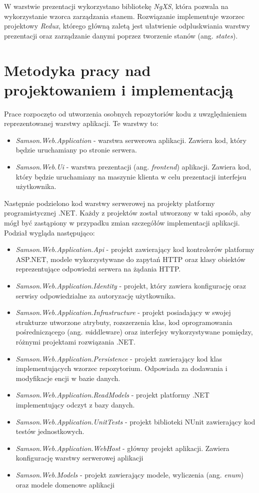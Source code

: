 \documentclass[a4paper,twoside,12pt]{book}
\newcommand{\obcy}[1]{\emph{#1}}
\newcommand{\ang}[1]{{\selectlanguage{british}\obcy{#1}}}
\begin{document}
	W warstwie prezentacji wykorzystano bibliotekę \textit{NgXS}, która pozwala na wykorzystanie wzorca zarządzania stanem. Rozwiązanie implementuje wzorzec projektowy \textit{Redux}, którego główną zaletą jest ułatwienie odpluskwiania warstwy prezentacji oraz zarządzanie danymi poprzez tworzenie stanów (ang. \ang{states}).
	
	\section {Metodyka pracy nad projektowaniem i implementacją}
	
	Prace rozpoczęto od utworzenia osobnych repozytoriów kodu z uwzględnieniem reprezentowanej warstwy aplikacji. Te warstwy to:
	\begin{itemize}
		\item \textit{Samson.Web.Application} - warstwa serwerowa aplikacji. Zawiera kod, który będzie uruchamiany po stronie serwera.
		\item \textit{Samson.Web.Ui} - warstwa prezentacji (ang. \ang{frontend}) aplikacji. Zawiera kod, który będzie uruchamiany na maszynie klienta w celu prezentacji interfejsu użytkownika.
	\end{itemize}

	Następnie podzielono kod warstwy serwerowej na projekty platformy programistycznej .NET. Każdy z projektów został utworzony w taki sposób, aby mógł być zastąpiony w przypadku zmian szczegółów implementacji aplikacji. Podział wygląda następująco:
	\begin{itemize}
		\item \textit{Samson.Web.Application.Api} - projekt zawierający kod kontrolerów platformy ASP.NET, modele wykorzystywane do zapytań HTTP oraz klasy obiektów reprezentujące odpowiedzi serwera na żądania HTTP.
		\item \textit{Samson.Web.Application.Identity} - projekt, który zawiera konfigurację oraz serwisy odpowiedzialne za autoryzację użytkownika.
		\item \textit{Samson.Web.Application.Infrastructure} - projekt posiadający w swojej strukturze utworzone atrybuty, rozszerzenia klas, kod oprogramowania pośredniczącego (ang. \ang middleware) oraz interfejsy wykorzystywane pomiędzy, różnymi projektami rozwiązania .NET.
		\item \textit{Samson.Web.Application.Persistence} - projekt zawierający kod klas implementujących wzorzec repozytorium. Odpowiada za dodawania i modyfikacje encji w bazie danych.
		\item \textit{Samson.Web.Application.ReadModels} - projekt platformy .NET implementujący odczyt z bazy danych.
		\item \textit{Samson.Web.Application.UnitTests} - projekt biblioteki NUnit zawierający kod testów jednostkowych.
		\item \textit{Samson.Web.Application.WebHost} - główny projekt aplikacji. Zawiera konfigurację warstwy serwerowej aplikacji
		\item \textit{Samson.Web.Models} - projekt zawierający modele, wyliczenia (ang. \ang{enum}) oraz modele domenowe aplikacji
	\end{itemize}
	
\end{document}
